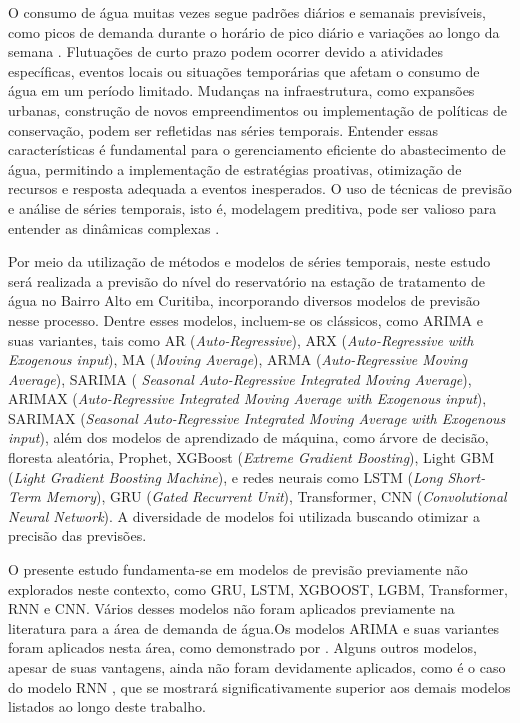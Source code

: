 O consumo de água muitas vezes segue padrões diários e semanais previsíveis, como picos de demanda durante o horário de pico diário e variações ao longo da semana \cite{SIEGEL2020103481}. Flutuações de curto prazo podem ocorrer devido a atividades específicas, eventos locais ou situações temporárias que afetam o consumo de água em um período limitado. Mudanças na infraestrutura, como expansões urbanas, construção de novos empreendimentos ou implementação de políticas de conservação, podem ser refletidas nas séries temporais. Entender essas características é fundamental para o gerenciamento eficiente do abastecimento de água, permitindo a implementação de estratégias proativas, otimização de recursos e resposta adequada a eventos inesperados. O uso de técnicas de previsão e análise de séries temporais, isto é, modelagem preditiva, pode ser valioso para entender as dinâmicas complexas \cite{UCCASTILLO2023105788}.

Por meio da utilização de métodos e modelos de séries temporais, neste estudo será realizada a previsão do nível do reservatório na estação de tratamento de água no Bairro Alto em Curitiba, incorporando diversos modelos de previsão nesse processo. Dentre esses modelos, incluem-se os clássicos, como ARIMA e suas variantes, tais como AR (\textit{Auto-Regressive}), ARX (\textit{Auto-Regressive with Exogenous input}), MA (\textit{Moving Average}), ARMA (\textit{Auto-Regressive Moving Average}), SARIMA ( \textit{Seasonal Auto-Regressive Integrated Moving Average}), ARIMAX (\textit{Auto-Regressive Integrated Moving Average with Exogenous input}), SARIMAX (\textit{Seasonal Auto-Regressive Integrated Moving Average with Exogenous input}), além dos modelos de aprendizado de máquina, como árvore de decisão, floresta aleatória, Prophet, XGBoost (\textit{Extreme Gradient Boosting}), Light GBM (\textit{Light Gradient Boosting Machine}), e redes neurais como LSTM  (\textit{Long Short-Term Memory}), GRU (\textit{Gated Recurrent Unit}), Transformer, CNN (\textit{Convolutional Neural Network}). A diversidade de modelos foi utilizada buscando otimizar a precisão das previsões.

O presente estudo fundamenta-se em modelos de previsão previamente não explorados neste contexto, como GRU, LSTM, XGBOOST, LGBM, Transformer, RNN e CNN. Vários desses modelos não foram aplicados previamente na literatura para a área de demanda de água.Os modelos ARIMA e suas variantes foram aplicados nesta área, como demonstrado por \cite{2-s2.0-85069459067, 2-s2.0-85099424908}. Alguns outros modelos, apesar de suas vantagens, ainda não foram devidamente aplicados, como é o caso do modelo RNN \cite{2-s2.0-85067419084}, que se mostrará significativamente superior aos demais modelos listados ao longo deste trabalho.

